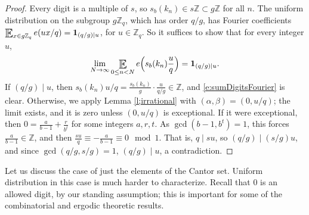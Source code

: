 \begin{proof}
Every digit is a multiple of $s$, so $s_b(k_n)\in s\mathbb{Z}\subset g\mathbb{Z}$ for all $n$. 
The uniform distribution on the subgroup $g\mathbb{Z}_q$, which has order $q/g$, has Fourier coefficients 
$\Expectation_{x\in g\mathbb{Z}_q}e(ux/q)=\mathbf{1}_{(q/g)\mid u}$, for $u\in\mathbb{Z}_q$. 
So it suffices to show that for every integer $u$, 
\begin{align}\label{e:sumDigitsFourier}
\lim_{N\to\infty} 
\Expectation_{0\leq n<N}e\Bigl(s_b(k_n) \frac{u}{q}\Bigr) =\mathbf{1}_{(q/g)\mid u}. 
\end{align}
If $(q/g)\mid u$, then $s_b(k_n)u/q=\frac{s_b(k_n)}{g}\cdot\frac{u}{q/g}\in\mathbb{Z}$, and \eqref{e:sumDigitsFourier} is clear. 
Otherwise, we apply Lemma \ref{l;irrational} with $(\alpha,\beta)=(0,u/q)$; the limit exists, and it is zero unless $(0,u/q)$ is exceptional. 
If it were exceptional, then $0=\frac{a}{b-1}+\frac{r}{b^t}$ for some integers $a,r,t$. As $\gcd(b-1,b^t)=1$, this forces $\frac{a}{b-1}\in\mathbb{Z}$, 
and then $\frac{su}{q}\equiv-\frac{a}{b-1}\equiv 0\mod 1$. That is, $q\mid su$, so $(q/g)\mid (s/g)u$, and since $\gcd(q/g,s/g)=1$, $(q/g)\mid u$, a contradiction. 
\end{proof}


Let us discuss the case of just the elements of the Cantor set.  Uniform distribution in this case is much harder to characterize.  Recall that $0$ is an allowed digit, by our standing assumption; this is important for some of the combinatorial and ergodic theoretic results. 



